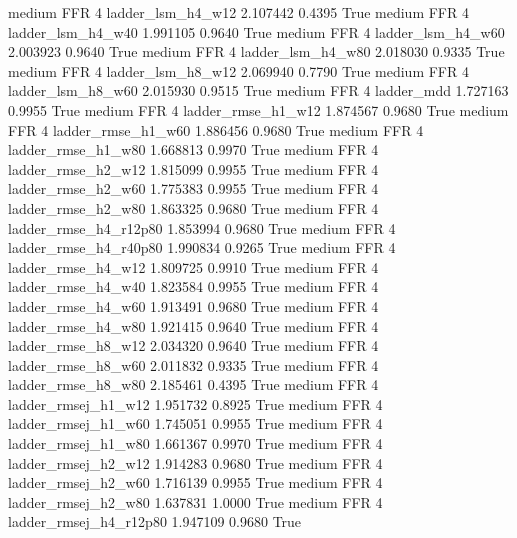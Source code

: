     medium      FFR                 4      ladder_lsm_h4_w12   2.107442      0.4395    True
    medium      FFR                 4      ladder_lsm_h4_w40   1.991105      0.9640    True
    medium      FFR                 4      ladder_lsm_h4_w60   2.003923      0.9640    True
    medium      FFR                 4      ladder_lsm_h4_w80   2.018030      0.9335    True
    medium      FFR                 4      ladder_lsm_h8_w12   2.069940      0.7790    True
    medium      FFR                 4      ladder_lsm_h8_w60   2.015930      0.9515    True
    medium      FFR                 4             ladder_mdd   1.727163      0.9955    True
    medium      FFR                 4     ladder_rmse_h1_w12   1.874567      0.9680    True
    medium      FFR                 4     ladder_rmse_h1_w60   1.886456      0.9680    True
    medium      FFR                 4     ladder_rmse_h1_w80   1.668813      0.9970    True
    medium      FFR                 4     ladder_rmse_h2_w12   1.815099      0.9955    True
    medium      FFR                 4     ladder_rmse_h2_w60   1.775383      0.9955    True
    medium      FFR                 4     ladder_rmse_h2_w80   1.863325      0.9680    True
    medium      FFR                 4  ladder_rmse_h4_r12p80   1.853994      0.9680    True
    medium      FFR                 4  ladder_rmse_h4_r40p80   1.990834      0.9265    True
    medium      FFR                 4     ladder_rmse_h4_w12   1.809725      0.9910    True
    medium      FFR                 4     ladder_rmse_h4_w40   1.823584      0.9955    True
    medium      FFR                 4     ladder_rmse_h4_w60   1.913491      0.9680    True
    medium      FFR                 4     ladder_rmse_h4_w80   1.921415      0.9640    True
    medium      FFR                 4     ladder_rmse_h8_w12   2.034320      0.9640    True
    medium      FFR                 4     ladder_rmse_h8_w60   2.011832      0.9335    True
    medium      FFR                 4     ladder_rmse_h8_w80   2.185461      0.4395    True
    medium      FFR                 4    ladder_rmsej_h1_w12   1.951732      0.8925    True
    medium      FFR                 4    ladder_rmsej_h1_w60   1.745051      0.9955    True
    medium      FFR                 4    ladder_rmsej_h1_w80   1.661367      0.9970    True
    medium      FFR                 4    ladder_rmsej_h2_w12   1.914283      0.9680    True
    medium      FFR                 4    ladder_rmsej_h2_w60   1.716139      0.9955    True
    medium      FFR                 4    ladder_rmsej_h2_w80   1.637831      1.0000    True
    medium      FFR                 4 ladder_rmsej_h4_r12p80   1.947109      0.9680    True
